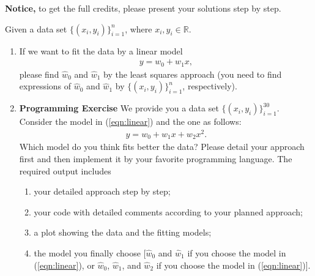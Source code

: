 \textbf{Notice, }to get the full credits, please present your solutions step by step.

\begin{exercise}
	Given a data set $\{ (x_i ,y_i) \}_{i=1}^{n}$, where $x_i,y_i\in \mathbb{R}$. 
	\begin{enumerate}
	    \item If we want to fit the data by a linear model
	        \begin{align}\label{eqn:linear}
	            y =  w_0 + w_1 x,
	        \end{align}
	        please find $\hat{w}_0$ and $\hat{w}_1$ by the least squares approach (you need to find expressions of $\hat{w}_0$ and $\hat{w}_1$ by $\{ (x_i ,y_i) \}_{i=1}^{n}$, respectively).
	    \item \textbf{Programming Exercise} We provide you a data set $\{ (x_i ,y_i) \}_{i=1}^{30}$. Consider the model in (\ref{eqn:linear}) and the one as follows:
	        \begin{align}\label{eqn:linear-quadratic}
	            y =  w_0 + w_1 x+ w_2 x^2. 
	        \end{align}
	        Which model do you think fits better the data? Please detail your approach first and then implement it by your favorite programming language. The required output includes 
	        \begin{enumerate}
	            \item your detailed approach step by step; 
	            \item your code with detailed comments according to your planned approach; 
	            \item a plot showing the data and the fitting models; 
	            \item the model you finally choose [$\hat{w}_0$ and $\hat{w}_1$ if you choose the model in (\ref{eqn:linear}), or $\hat{w}_0$, $\hat{w}_1$, and $\hat{w}_2$ if you choose the model in (\ref{eqn:linear})].
	        \end{enumerate}
	\end{enumerate}
\end{exercise}
\newpage
